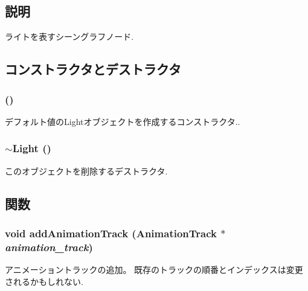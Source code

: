 \subsection{説明}
ライトを表すシーングラフノード. 

\subsection{コンストラクタとデストラクタ}
\hypertarget{classm3g_1_1Light_7f8a7be05225f470c200f7e4ff914a3c}{
\subsubsection[{Light}]{ ()}}
\label{classm3g_1_1Light_7f8a7be05225f470c200f7e4ff914a3c}


デフォルト値のLightオブジェクトを作成するコンストラクタ.. \hypertarget{classm3g_1_1Light_f50d3d8cdb323e1a9fbd7bfac3aeba06}{
\subsubsection[{$\sim$Light}]{\setlength{\rightskip}{0pt plus 5cm}$\sim${\bf Light} ()}}
\label{classm3g_1_1Light_f50d3d8cdb323e1a9fbd7bfac3aeba06}


このオブジェクトを削除するデストラクタ. 

\subsection{関数}
\hypertarget{classm3g_1_1Light_415c0b110f95410ded9b85e5d99a496b}{
\subsubsection[{addAnimationTrack}]{\setlength{\rightskip}{0pt plus 5cm}void addAnimationTrack ({\bf AnimationTrack} $\ast$ {\em animation\_\-track})}}
\label{classm3g_1_1Light_415c0b110f95410ded9b85e5d99a496b}


アニメーショントラックの追加。 既存のトラックの順番とインデックスは変更されるかもしれない. 

